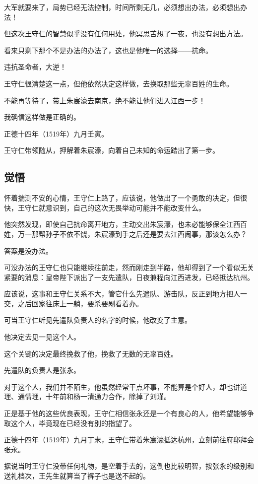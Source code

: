 \begin{multicols}{\theparacolNo}
大军就要来了，局势已经无法控制，时间所剩无几，必须想出办法，必须想出办法！

但这次王守仁的智慧似乎没有任何用处，他冥思苦想了一夜，也没有想出方法。

看来只剩下那个不是办法的办法了，这也是他唯一的选择——抗命。

违抗圣命者，大逆！

王守仁很清楚这一点，但他依然决定这样做，去换取那些无辜百姓的生命。

不能再等待了，带上朱宸濠去南京，绝不能让他们进入江西一步！

我确信这样做是正确的。

正德十四年（1519年）九月壬寅。

王守仁带领随从，押解着朱宸濠，向着自己未知的命运踏出了第一步。

\subsection{觉悟}
怀着揣测不安的心情，王守仁上路了，应该说，他做出了一个勇敢的决定，但很快，王守仁就意识到，自己的这次无畏举动可能并不能改变什么。

他突然发现，即使自己抗命离开地方，主动交出朱宸濠，也未必能够保全江西百姓，万一那帮孙子不依不饶，朱宸濠到手之后还是要去江西闹事，那该怎么办？

答案是没办法。

可没办法的王守仁也只能继续往前走，然而刚走到半路，他却得到了一个看似无关紧要的消息：皇帝陛下派出了一支先遣队，日夜兼程向江西进发，已经抵达杭州。

应该说，这事和王守仁关系不大，管它什么先遣队、游击队，反正到地方把人一交，之后回家往床上一躺，要杀要剐看着办。

可当王守仁听见先遣队负责人的名字的时候，他改变了主意。

他决定去见一见这个人。

这个关键的决定最终挽救了他，挽救了无数的无辜百姓。

先遣队的负责人是张永。

对于这个人，我们并不陌生，他虽然经常干点坏事，不能算是个好人，却也讲道理、通情理，十年前和杨一清通力合作，除掉了刘瑾。

正是基于他的这些优良表现，王守仁相信张永还是一个有良心的人，他希望能够争取这个人，毕竟现在已经没有别的指望了。

正德十四年（1519年）九月丁末，王守仁带着朱宸濠抵达杭州，立刻前往府邸拜会张永。

据说当时王守仁没带任何礼物，是空着手去的，这倒也比较明智，按张永的级别和送礼档次，王先生就算当了裤子也是送不起的。


\end{multicols}
